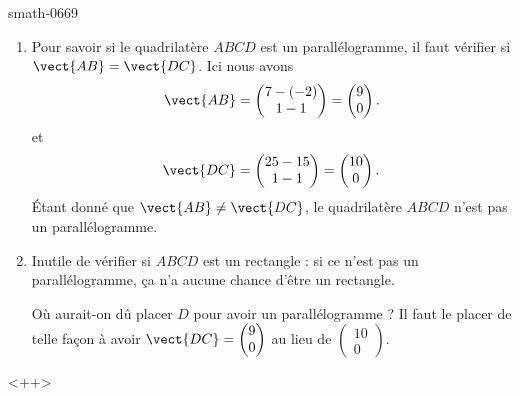 
\begin{corrige}{smath-0669}

    \begin{enumerate}
        \item
            Pour savoir si le quadrilatère \( ABCD\) est un parallélogramme, il faut vérifier si \( \vect{ AB }=\vect{ DC }\). Ici nous avons
            \begin{equation}
                \vect{ AB }=\begin{pmatrix}
                    7-(-2)    \\ 
                    1-1    
                \end{pmatrix}=\begin{pmatrix}
                    9    \\ 
                    0    
                \end{pmatrix}.
            \end{equation}
            et
            \begin{equation}
                \vect{ DC }=\begin{pmatrix}
                    25-15    \\ 
                    1-1    
                \end{pmatrix}=\begin{pmatrix}
                    10    \\ 
                    0    
                \end{pmatrix}.
            \end{equation}
            Étant donné que \( \vect{ AB }\neq \vect{ DC }\), le quadrilatère \( ABCD\) n'est pas un parallélogramme.
        \item
            Inutile de vérifier si \( ABCD\) est un rectangle : si ce n'est pas un parallélogramme, ça n'a aucune chance d'être un rectangle.

            Où aurait-on dû placer \( D\) pour avoir un parallélogramme ? Il faut le placer de telle façon à avoir \( \vect{ DC }=\begin{pmatrix}
                9    \\ 
                0    
            \end{pmatrix}\) au lieu de \( \begin{pmatrix}
                10    \\ 
                    0
            \end{pmatrix}\).
    \end{enumerate}
    <++>

\end{corrige}
